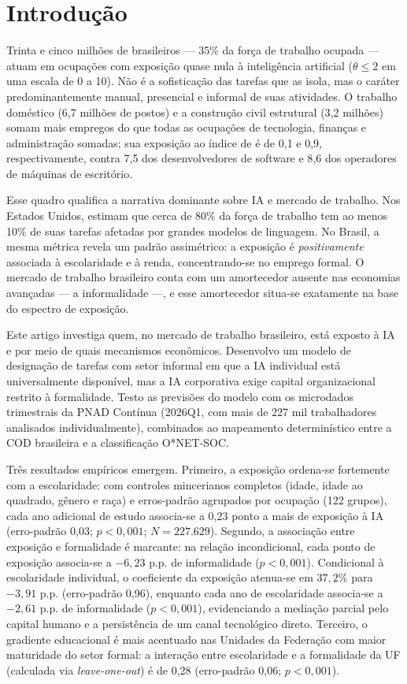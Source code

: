 \section{Introdução}
\label{sec:intro}

Trinta e cinco milhões de brasileiros --- 35\% da força de trabalho ocupada --- atuam em ocupações com exposição quase nula à inteligência artificial ($\theta \le 2$ em uma escala de 0 a 10). Não é a sofisticação das tarefas que as isola, mas o caráter predominantemente manual, presencial e informal de suas atividades. O trabalho doméstico (6{,}7 milhões de postos) e a construção civil estrutural (3{,}2 milhões) somam mais empregos do que todas as ocupações de tecnologia, finanças e administração somadas; sua exposição ao índice de \citet{eloundou2024gpts} é de 0{,}1 e 0{,}9, respectivamente, contra 7{,}5 dos desenvolvedores de software e 8{,}6 dos operadores de máquinas de escritório.

Esse quadro qualifica a narrativa dominante sobre IA e mercado de trabalho. Nos Estados Unidos, \citet{eloundou2024gpts} estimam que cerca de 80\% da força de trabalho tem ao menos 10\% de suas tarefas afetadas por grandes modelos de linguagem. No Brasil, a mesma métrica revela um padrão assimétrico: a exposição é \emph{positivamente} associada à escolaridade e à renda, concentrando-se no emprego formal. O mercado de trabalho brasileiro conta com um amortecedor ausente nas economias avançadas --- a informalidade ---, e esse amortecedor situa-se exatamente na base do espectro de exposição.

Este artigo investiga quem, no mercado de trabalho brasileiro, está exposto à IA e por meio de quais mecanismos econômicos. Desenvolvo um modelo de designação de tarefas com setor informal em que a IA individual está universalmente disponível, mas a IA corporativa exige capital organizacional restrito à formalidade. Testo as previsões do modelo com os microdados trimestrais da PNAD Contínua (2026Q1, com mais de 227 mil trabalhadores analisados individualmente), combinados ao mapeamento determinístico entre a COD brasileira e a classificação O*NET-SOC.

Três resultados empíricos emergem. Primeiro, a exposição ordena-se fortemente com a escolaridade: com controles mincerianos completos (idade, idade ao quadrado, gênero e raça) e erros-padrão agrupados por ocupação (122 grupos), cada ano adicional de estudo associa-se a 0{,}23 ponto a mais de exposição à IA (erro-padrão 0{,}03; $p < 0{,}001$; $N = 227.629$). Segundo, a associação entre exposição e formalidade é marcante: na relação incondicional, cada ponto de exposição associa-se a $-6{,}23$ p.p. de informalidade ($p < 0{,}001$). Condicional à escolaridade individual, o coeficiente da exposição atenua-se em $37{,}2\%$ para $-3{,}91$ p.p. (erro-padrão 0{,}96), enquanto cada ano de escolaridade associa-se a $-2{,}61$ p.p. de informalidade ($p < 0{,}001$), evidenciando a mediação parcial pelo capital humano e a persistência de um canal tecnológico direto. Terceiro, o gradiente educacional é mais acentuado nas Unidades da Federação com maior maturidade do setor formal: a interação entre escolaridade e a formalidade da UF (calculada via \emph{leave-one-out}) é de 0{,}28 (erro-padrão 0{,}06; $p < 0{,}001$).

